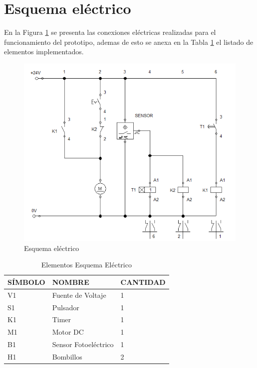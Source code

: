 \newpage
	\section{Esquema eléctrico}
		En la Figura \ref{fig:Esquema} se presenta las conexiones eléctricas realizadas para el funcionamiento del prototipo, ademas de esto se anexa en la Tabla \ref{table:esquema} el listado de elementos implementados.  
		\begin{figure}[ht]
			\centering
			\includegraphics[scale=0.5]{Figs/66.png}
			\caption{Esquema eléctrico}
			\label{fig:Esquema}
		\end{figure}
	
		\begin{table}[ht]
		\centering
		\begin{tabular}{|p{2cm}|p{5cm}||p{3cm}|}
			\hline
			SÍMBOLO & NOMBRE & CANTIDAD \\ 
			\hline
			 V1 & Fuente de Voltaje & 1 \\
			\hline
			 S1 & Pulsador & 1 \\
			\hline
			 K1 & Timer & 1 \\
			\hline
			 M1 & Motor DC & 1 \\
			\hline
			 B1 & Sensor Fotoeléctrico & 1 \\
			\hline
			 H1 & Bombillos & 2 \\
			\hline
		\end{tabular}	
		\caption{Elementos Esquema Eléctrico}
		\label{table:esquema}
		\end{table}	
		
